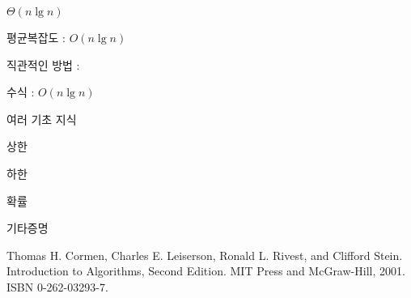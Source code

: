 \documentclass{oblivoir}
\begin{document}
$\Theta(n \lg n)$


평균복잡도 : $O(n \lg n)$


직관적인 방법 : 


수식 : $O(n \lg n)$


여러 기초 지식



상한 

하한


확률


기타증명






\begin{thebibliography}{}
    Thomas H. Cormen, Charles E. Leiserson, Ronald L. Rivest, and Clifford Stein. Introduction to Algorithms, Second Edition. MIT Press and McGraw-Hill, 2001. ISBN 0-262-03293-7.
\end{thebibliography}
    
\end{document}
